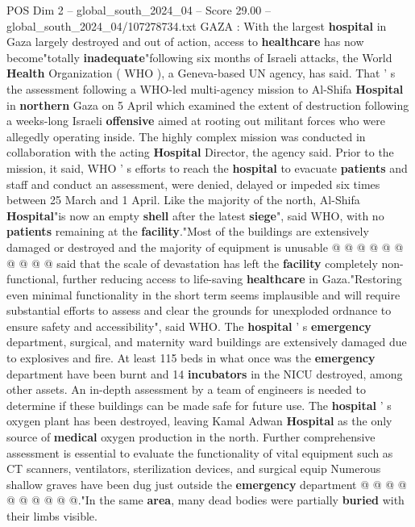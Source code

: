 \begin{textsample}{POS Dim 2 – global\_south\_2024\_04 – Score 29.00 – global\_south\_2024\_04/107278734.txt}  \label{ex:f2_pos_151}
GAZA : With the largest \textbf{hospital} in Gaza largely destroyed and out of action, access to \textbf{healthcare} has now become"totally \textbf{inadequate}"following six months of Israeli attacks, the World \textbf{Health} Organization ( WHO ), a Geneva-based UN agency, has said.
That ' s the assessment following a WHO-led multi-agency mission to Al-Shifa \textbf{Hospital} in \textbf{northern} Gaza on 5 April which examined the extent of destruction following a weeks-long Israeli \textbf{offensive} aimed at rooting out militant forces who were allegedly operating inside.
The highly complex mission was conducted in collaboration with the acting \textbf{Hospital} Director, the agency said.
Prior to the mission, it said, WHO ' s efforts to reach the \textbf{hospital} to evacuate \textbf{patients} and staff and conduct an assessment, were denied, delayed or impeded six times between 25 March and 1 April.
Like the majority of the north, Al-Shifa \textbf{Hospital}"is now an empty \textbf{shell} after the latest \textbf{siege}", said WHO, with no \textbf{patients} remaining at the \textbf{facility}."Most of the buildings are extensively damaged or destroyed and the majority of equipment is unusable @ @ @ @ @ @ @ @ @ @ said that the scale of devastation has left the \textbf{facility} completely non-functional, further reducing access to life-saving \textbf{healthcare} in Gaza."Restoring even minimal functionality in the short term seems implausible and will require substantial efforts to assess and clear the grounds for unexploded ordnance to ensure safety and accessibility", said WHO.
The \textbf{hospital} ' s \textbf{emergency} department, surgical, and maternity ward buildings are extensively damaged due to explosives and fire.
At least 115 beds in what once was the \textbf{emergency} department have been burnt and 14 \textbf{incubators} in the NICU destroyed, among other assets.
An in-depth assessment by a team of engineers is needed to determine if these buildings can be made safe for future use.
The \textbf{hospital} ' s oxygen plant has been destroyed, leaving Kamal Adwan \textbf{Hospital} as the only source of \textbf{medical} oxygen production in the north.
Further comprehensive assessment is essential to evaluate the functionality of vital equipment such as CT scanners, ventilators, sterilization devices, and surgical equip Numerous shallow graves have been dug just outside the \textbf{emergency} department @ @ @ @ @ @ @ @ @ @."In the same \textbf{area}, many dead bodies were partially \textbf{buried} with their limbs visible.

\end{textsample}
